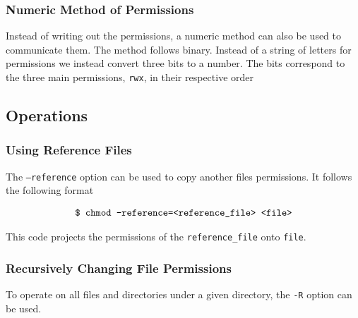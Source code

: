\documentclass{report}
\begin{document}
\subsubsection{Numeric Method of Permissions}
    Instead of writing out the permissions, a numeric method can also be used to communicate them. The method follows binary. Instead of a string of letters for permissions we instead convert three bits to a number. The bits correspond to the three main permissions, \texttt{rwx}, in their respective order


\subsection{Operations}

\subsubsection{Using Reference Files}

      The \texttt{--reference} option can be used to copy another files permissions. It follows the following format

      \vspace{-.4cm}
       \begin{align*}
         \textnormal{\texttt{\$ chmod --reference=<reference\_file> <file>}}
       \end{align*}
      
       This code projects the permissions of the \texttt{reference\_file} onto \texttt{file}.

       \subsubsection{Recursively Changing File Permissions}
       To operate on all files and directories under a given directory, the \texttt{-R} option can be used.
\end{document}
